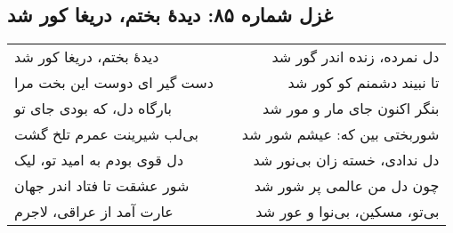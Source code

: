 \begin{center}
\section*{غزل شماره ۸۵: دیدهٔ بختم، دریغا کور شد}
\label{sec:085}
\begin{longtable}{l p{0.5cm} r}
دیدهٔ بختم، دریغا کور شد
&&
دل نمرده، زنده اندر گور شد
\\
دست گیر ای دوست این بخت مرا
&&
تا نبیند دشمنم کو کور شد
\\
بارگاه دل، که بودی جای تو
&&
بنگر اکنون جای مار و مور شد
\\
بی‌لب شیرینت عمرم تلخ گشت
&&
شوربختی بین که: عیشم شور شد
\\
دل قوی بودم به امید تو، لیک
&&
دل ندادی، خسته زان بی‌نور شد
\\
شور عشقت تا فتاد اندر جهان
&&
چون دل من عالمی پر شور شد
\\
عارت آمد از عراقی، لاجرم
&&
بی‌تو، مسکین، بی‌نوا و عور شد
\\
\end{longtable}
\end{center}
